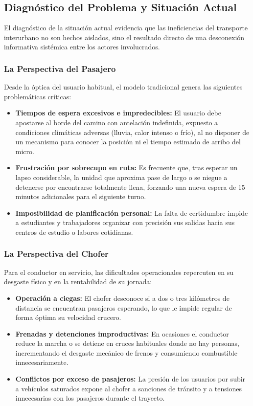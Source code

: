 \subsection{Diagnóstico del Problema y Situación Actual}

El diagnóstico de la situación actual evidencia que las ineficiencias del transporte interurbano no son hechos aislados, sino el resultado directo de una desconexión informativa sistémica entre los actores involucrados.

\subsubsection{La Perspectiva del Pasajero}

Desde la óptica del usuario habitual, el modelo tradicional genera las siguientes problemáticas críticas:

\begin{itemize}
    \item \textbf{Tiempos de espera excesivos e impredecibles:} El usuario debe apostarse al borde del camino con antelación indefinida, expuesto a condiciones climáticas adversas (lluvia, calor intenso o frío), al no disponer de un mecanismo para conocer la posición ni el tiempo estimado de arribo del micro.
    \item \textbf{Frustración por sobrecupo en ruta:} Es frecuente que, tras esperar un lapso considerable, la unidad que aproxima pase de largo o se niegue a detenerse por encontrarse totalmente llena, forzando una nueva espera de 15 minutos adicionales para el siguiente turno.
    \item \textbf{Imposibilidad de planificación personal:} La falta de certidumbre impide a estudiantes y trabajadores organizar con precisión sus salidas hacia sus centros de estudio o labores cotidianas.
\end{itemize}

\subsubsection{La Perspectiva del Chofer}

Para el conductor en servicio, las dificultades operacionales repercuten en su desgaste físico y en la rentabilidad de su jornada:

\begin{itemize}
    \item \textbf{Operación a ciegas:} El chofer desconoce si a dos o tres kilómetros de distancia se encuentran pasajeros esperando, lo que le impide regular de forma óptima su velocidad crucero.
    \item \textbf{Frenadas y detenciones improductivas:} En ocasiones el conductor reduce la marcha o se detiene en cruces habituales donde no hay personas, incrementando el desgaste mecánico de frenos y consumiendo combustible innecesariamente.
    \item \textbf{Conflictos por exceso de pasajeros:} La presión de los usuarios por subir a vehículos saturados expone al chofer a sanciones de tránsito y a tensiones innecesarias con los pasajeros durante el trayecto.
\end{itemize}

